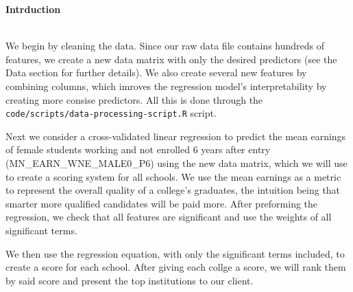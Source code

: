 \documentclass{article}
\begin{document}


{\large\textbf{Intrduction}} \\\

We begin by cleaning the data. Since our raw data file contains hundreds of features, we create a new data matrix with only the desired predictors (see the Data section for further details). We also create several new features by combining columns, which imroves the regression model's interpretability by creating more consise predictors. All this is done through the 
\texttt{code/scripts/data-processing-script.R} script.

Next we consider a cross-validated linear regression to predict the mean earnings of female students working and not enrolled 6 years after entry \\
(MN\_EARN\_WNE\_MALE0\_P6) using the new data matrix, which we will use to create a scoring system for all schools. We use the mean earnings as a metric to represent the overall quality of a college's graduates, the intuition being that smarter more qualified candidates will be paid more. After preforming the regression, we check that all features are significant and use the weights of all significant terms.

We then use the regression equation, with only the significant terms included, to create a score for each school. After giving each collge a score, we will rank them by said score and present the top institutions to our client.
\end{document}

